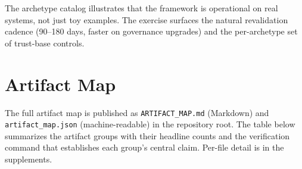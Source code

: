 \documentclass[11pt,a4paper]{article}
\begin{document}
The archetype catalog illustrates that the framework is operational on real systems, not just toy examples. The exercise surfaces the natural revalidation cadence (90--180 days, faster on governance upgrades) and the per-archetype set of trust-base controls.





\clearpage

\section{Artifact Map}\label{app:artifact}

The full artifact map is published as \texttt{ARTIFACT\_MAP.md} (Markdown) and \texttt{artifact\_map.json} (machine-readable) in the repository root. The table below summarizes the artifact groups with their headline counts and the verification command that establishes each group's central claim. Per-file detail is in the supplements.
\end{document}
